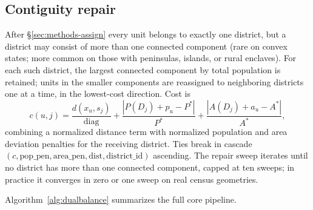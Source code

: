 \subsection{Contiguity repair}
\label{sec:methods-repair}

After \S\ref{sec:methods-assign} every unit belongs to exactly one
district, but a district may consist of more than one connected
component (rare on convex states; more common on those with
peninsulas, islands, or rural enclaves). For each such district,
the largest connected component by total population is retained;
units in the smaller components are reassigned to neighboring
districts one at a time, in the lowest-cost direction. Cost is
\[
  c(u, j) = \frac{d(x_u, s_j)}{\mathrm{diag}}
          + \frac{|P(D_j) + p_u - P^*|}{P^*}
          + \frac{|A(D_j) + a_u - A^*|}{A^*},
\]
combining a normalized distance term with normalized population and
area deviation penalties for the receiving district. Ties break in
cascade $(c, \mathrm{pop\_pen}, \mathrm{area\_pen}, \mathrm{dist},
\mathrm{district\_id})$ ascending. The repair sweep iterates until no
district has more than one connected component, capped at ten sweeps;
in practice it converges in zero or one sweep on real census
geometries.

Algorithm~\ref{alg:dualbalance} summarizes the full core pipeline.


